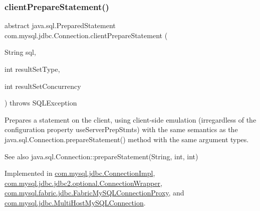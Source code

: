 \subsubsection{\texorpdfstring{client\+Prepare\+Statement()}{clientPrepareStatement()}\hspace{0.1cm}{\footnotesize\ttfamily [3/6]}}
{\footnotesize\ttfamily abstract java.\+sql.\+Prepared\+Statement com.\+mysql.\+jdbc.\+Connection.\+client\+Prepare\+Statement (\begin{DoxyParamCaption}\item[{String}]{sql,  }\item[{int}]{result\+Set\+Type,  }\item[{int}]{result\+Set\+Concurrency }\end{DoxyParamCaption}) throws S\+Q\+L\+Exception\hspace{0.3cm}{\ttfamily [abstract]}}

Prepares a statement on the client, using client-\/side emulation (irregardless of the configuration property \textquotesingle{}use\+Server\+Prep\+Stmts\textquotesingle{}) with the same semantics as the java.\+sql.\+Connection.\+prepare\+Statement() method with the same argument types.

\begin{DoxySeeAlso}{See also}
java.\+sql.\+Connection\+::prepare\+Statement(\+String, int, int) 
\end{DoxySeeAlso}


Implemented in \mbox{\hyperlink{classcom_1_1mysql_1_1jdbc_1_1_connection_impl_a5e079f628e46e372708355bf45f8c7a3}{com.\+mysql.\+jdbc.\+Connection\+Impl}}, \mbox{\hyperlink{classcom_1_1mysql_1_1jdbc_1_1jdbc2_1_1optional_1_1_connection_wrapper_ad71fc526adef4d300477c03514b998c2}{com.\+mysql.\+jdbc.\+jdbc2.\+optional.\+Connection\+Wrapper}}, \mbox{\hyperlink{classcom_1_1mysql_1_1fabric_1_1jdbc_1_1_fabric_my_s_q_l_connection_proxy_a60a88d30678ff7c99831615f3b3a4a1b}{com.\+mysql.\+fabric.\+jdbc.\+Fabric\+My\+S\+Q\+L\+Connection\+Proxy}}, and \mbox{\hyperlink{classcom_1_1mysql_1_1jdbc_1_1_multi_host_my_s_q_l_connection_ad04846601b79203af77929064f64c043}{com.\+mysql.\+jdbc.\+Multi\+Host\+My\+S\+Q\+L\+Connection}}.

\mbox{\label{interfacecom_1_1mysql_1_1jdbc_1_1_connection_a0a5607f53ef9d376f1ff02fcffd038bf}} 
